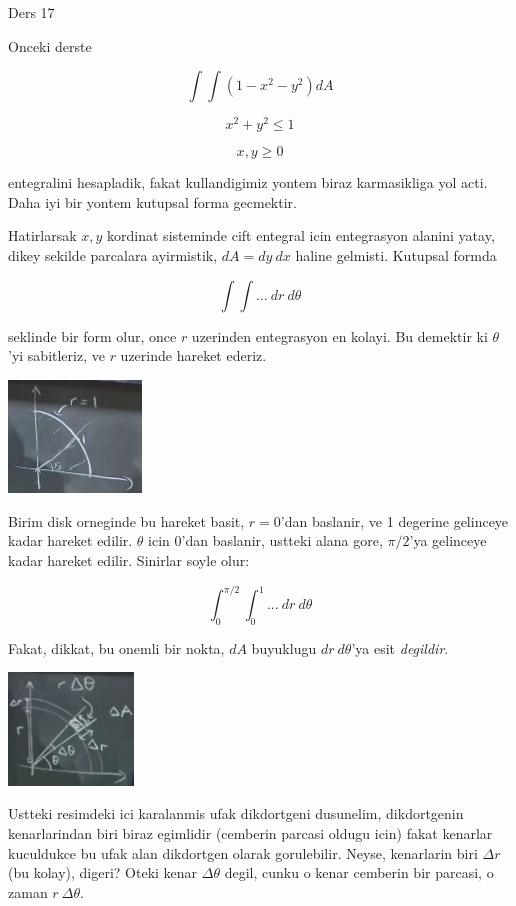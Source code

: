 \documentclass[12pt,fleqn]{article}
\begin{document}
Ders 17

Onceki derste 

\[ \int \int (1-x^2-y^2) dA \]

\[ x^2+y^2 \le 1 \]

\[ x,y \ge 0 \]

entegralini hesapladik, fakat kullandigimiz yontem biraz karmasikliga yol
acti. Daha iyi bir yontem kutupsal forma gecmektir. 

Hatirlarsak $x,y$ kordinat sisteminde cift entegral icin entegrasyon
alanini yatay, dikey sekilde parcalara ayirmistik, $dA = dy \ dx$ haline
gelmisti. Kutupsal formda 

\[ \int \int  ... \ dr \ d\theta\]

seklinde bir form olur, once $r$ uzerinden entegrasyon en kolayi. Bu
demektir ki $\theta$'yi sabitleriz, ve $r$ uzerinde hareket ederiz. 

\includegraphics[height=3cm]{17_1.png}

Birim disk orneginde bu hareket basit, $r=0$'dan baslanir, ve 1 degerine
gelinceye kadar hareket edilir. $\theta$ icin 0'dan baslanir, ustteki alana
gore, $\pi/2$'ya gelinceye kadar hareket edilir. Sinirlar soyle olur:

\[ \int_0^{\pi/2} \int_0^1  ... \ dr \ d\theta\]

Fakat, dikkat, bu onemli bir nokta, $dA$ buyuklugu $dr \ d\theta$'ya esit
{\em degildir}. 

\includegraphics[height=3cm]{17_2.png}

Ustteki resimdeki ici karalanmis ufak dikdortgeni dusunelim, dikdortgenin
kenarlarindan biri biraz egimlidir (cemberin parcasi oldugu icin) fakat
kenarlar kuculdukce bu ufak alan dikdortgen olarak gorulebilir. Neyse,
kenarlarin biri $\Delta r$ (bu kolay), digeri? Oteki kenar $\Delta \theta$
degil, cunku o kenar cemberin bir parcasi, o zaman $r \ \Delta \theta$.
\end{document}
